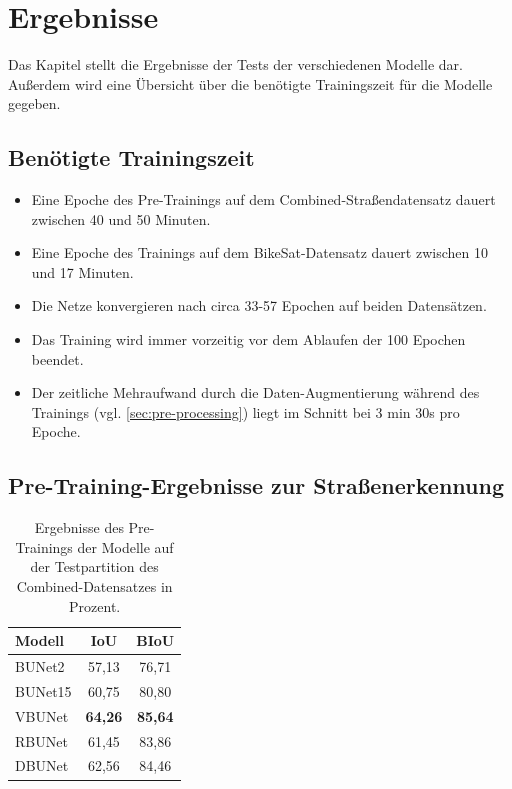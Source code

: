 \chapter{Ergebnisse} \label{sec:results}

Das Kapitel stellt die Ergebnisse der Tests der verschiedenen Modelle dar. Außerdem 
wird eine Übersicht über die benötigte Trainingszeit für die Modelle gegeben. 

\section{Benötigte Trainingszeit}

\begin{itemize}
    \item Eine Epoche des Pre-Trainings auf dem Combined-Straßendatensatz dauert zwischen 40 und 50 Minuten. 
    \item Eine Epoche des Trainings auf dem BikeSat-Datensatz dauert zwischen 10 und 17 Minuten. 
    \item Die Netze konvergieren nach circa 33-57 Epochen auf beiden Datensätzen. 
    \item Das Training wird immer vorzeitig vor dem Ablaufen der 100 Epochen beendet.
    \item Der zeitliche Mehraufwand durch die Daten-Augmentierung während des Trainings (vgl. \autoref{sec:pre-processing}) 
    liegt im Schnitt bei 3 min 30s pro Epoche.  
\end{itemize}

\section{Pre-Training-Ergebnisse zur Straßenerkennung}

\begin{table}[ht]
	\centering
	\begin{tabular}{l|c|c}
		Modell & \ac{IoU} & \ac{BIoU} \\
		\midrule
        BUNet2 & 57,13 & 76,71 \\ 
        BUNet15 & 60,75 & 80,80 \\ 
        VBUNet & \textbf{64,26} & \textbf{85,64} \\ 
        RBUNet & 61,45 & 83,86 \\ 
        DBUNet & 62,56 & 84,46 \\ 
        
	\end{tabular}
	\caption{Ergebnisse des Pre-Trainings der Modelle auf der Testpartition des Combined-Datensatzes in Prozent.}
	\label{tab:results-roads}
\end{table}

